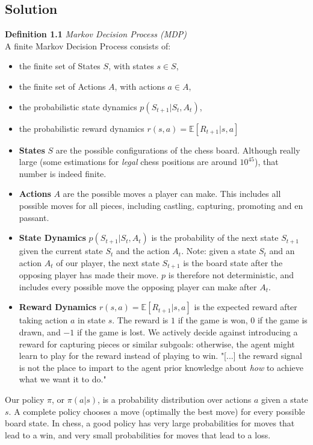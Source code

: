 \documentclass{article}
\begin{document}
\subsection{Solution}
\begin{tcolorbox}[colback=LightGray]
    \textbf{Definition 1.1} \textit{Markov Decision Process (MDP)} \\
    A finite Markov Decision Process consists of:
    \begin{itemize}
        \item the finite set of States $S$, with states $s \in S$,
        \item the finite set of Actions $A$, with actions $a \in A$,
        \item the probabilistic state dynamics $p(S_{t+1} | S_t, A_t)$,
        \item the probabilistic reward dynamics $r(s, a) = \mathbb{E}[R_{t+1} | s, a]$
    \end{itemize}
\end{tcolorbox}
\begin{itemize}
    \item \textbf{States} $S$ are the possible configurations of the chess board.
    Although really large (some estimations for \emph{legal} chess positions are around $10^{45}$),
    that number is indeed finite.
    \item \textbf{Actions} $A$ are the possible moves a player can make. This includes
    all possible moves for all pieces, including castling, capturing, promoting and en passant.
    \item \textbf{State Dynamics} $p(S_{t+1} | S_t, A_t)$ is the probability of the next state
    $S_{t+1}$ given the current state $S_t$ and the action $A_t$. Note: given a 
    state $S_t$ and an action $A_t$ of our player, the next state $S_{t+1}$ is the board state
    after the opposing player has made their move. $p$ is therefore not deterministic, and includes
    every possible move the opposing player can make after $A_t$.
    \item \textbf{Reward Dynamics} $r(s, a) = \mathbb{E}[R_{t+1} | s, a]$ is the expected reward
    after taking action $a$ in state $s$. The reward is $1$ if the game is won, $0$ if the game
    is drawn, and $-1$ if the game is lost. We actively decide against introducing a reward
    for capturing pieces or similar subgoals: otherwise, the agent might learn to play for
    the reward instead of playing to win. "[...] the reward signal is not the place to impart to the agent prior knowledge
    about \emph{how} to achieve what we want it to do." \cite{sutton_bach_barto_2018}
\end{itemize}
Our policy $\pi$, or $\pi(a|s)$, is a probability distribution over actions $a$ given a state $s$.
A complete policy chooses a move (optimally the best move) for every possible board state.
In chess, a good policy has very large probabilities for moves that lead to a win, and very small
probabilities for moves that lead to a loss. 
\end{document}
